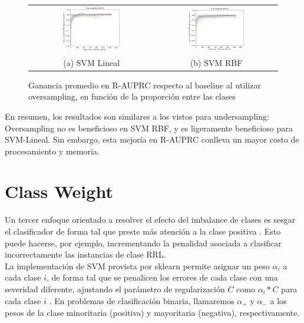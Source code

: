\begin{figure}[h!]
\begin{tabular}{cc}
    \includegraphics[width=0.49\textwidth]{Kap7/SMOTE_linearBEST.png} & \includegraphics[width=0.49\textwidth]{Kap7/SMOTE_rbfBEST.png} \\
(a) SVM Lineal& (b) SVM RBF
\end{tabular}
\caption{ Ganancia promedio en R-AUPRC respecto al baseline al utilizar oversampling, en función de la proporción entre las clases }
\label{fig:overall_oversampling}
\end{figure}

En resumen, los resultados son similares a los vistos para undersampling: Oversampling no es beneficioso en SVM RBF, y es ligeramente beneficioso para SVM-Lineal. Sin embargo, esta mejoría en R-AUPRC conlleva un mayor costo de procesamiento y memoria. 

\section{Class Weight}

Un tercer enfoque orientado a resolver el efecto del imbalance de clases es sesgar el clasificador de forma tal que preste más atención a la clase positiva \cite{imbalanced_svm}. Esto puede hacerse, por ejemplo, incrementando la penalidad asociada a clasificar incorrectamente las instancias de clase RRL. \\

La implementación de SVM provista por sklearn permite asignar un peso $\alpha_i$ a cada clase $i$, de forma tal que se penalicen los errores de cada clase con una severidad diferente, ajustando el parámetro de regularización $C$ como $\alpha_i * C$ para cada clase $i$ . En problemas de clasificación binaria, llamaremos $\alpha_+$ y $\alpha_-$ a los pesos de la clase minoritaria (positiva) y mayoritaria (negativa), respectivamente. \\

